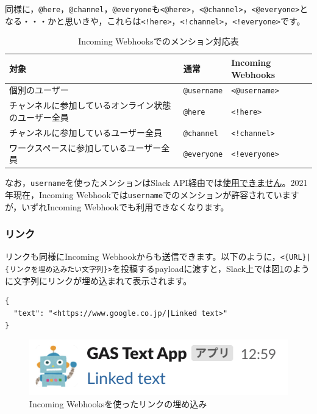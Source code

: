 \documentclass[uplatex,a4j]{jsarticle}
\begin{document}
同様に，\verb|@here|，\verb|@channel|，\verb|@everyone|も\verb|<@here>|，\verb|<@channel>|，\verb|<@everyone>|となる・・・かと思いきや，これらは\verb|<!here>|，\verb|<!channel>|，\verb|<!everyone>|です。

\begin{table}[H]
  \caption{Incoming Webhooksでのメンション対応表}
  \centering
  \begin{tabular}{l|ll}
対象 & 通常 & Incoming Webhooks \\ \hline
個別のユーザー & \verb|@username| & \verb|<@username>| \\
チャンネルに参加しているオンライン状態のユーザー全員 & \verb|@here| & \verb|<!here>| \\
チャンネルに参加しているユーザー全員 & \verb|@channel| & \verb|<!channel>| \\
ワークスペースに参加しているユーザー全員\footnotemark & \verb|@everyone| & \verb|<!everyone>| \\
  \end{tabular}
\end{table}


なお，\verb|username|を使ったメンションはSlack API経由では\href{https://api.slack.com/changelog/2017-09-the-one-about-usernames}{使用できません}。2021年現在，Incoming Webhookでは\verb|username|でのメンションが許容されていますが，いずれIncoming Webhookでも利用できなくなります。

\subsubsection{リンク}


リンクも同様にIncoming Webhookからも送信できます。以下のように，\verb+<{URL}|{リンクを埋め込みたい文字列}>+を投稿するpayloadに渡すと，Slack上では図\ref{fig:linked_text_sample}のように文字列にリンクが埋め込まれて表示されます。

\begin{lstlisting}[basicstyle=\ttfamily\footnotesize,frame=single,caption=Link payload sample,label=linkpayload]
{
  "text": "<https://www.google.co.jp/|Linked text>"
}
\end{lstlisting}

\begin{figure}[H]
 \centering
 \includegraphics[keepaspectratio, scale=0.8]{images/linked_text_sample.png}
 \caption{Incoming Webhooksを使ったリンクの埋め込み}
 \label{fig:linked_text_sample}
\end{figure}
\end{document}
